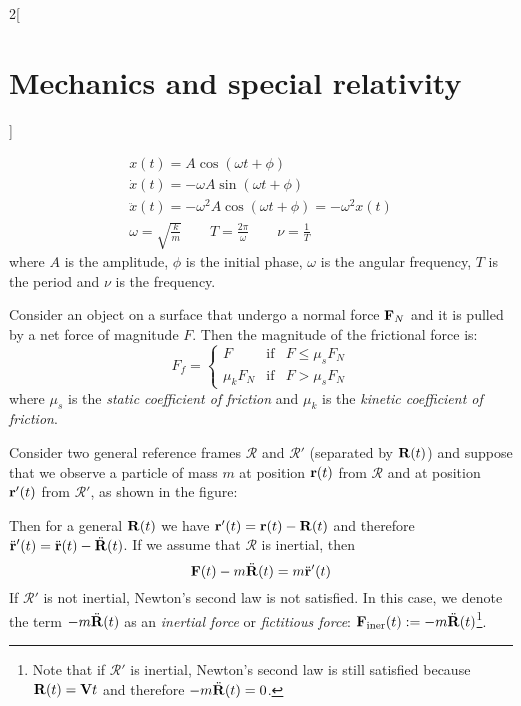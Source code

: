 \documentclass[../../../main.tex]{subfiles}
\begin{document}
\begin{multicols}{2}[\section{Mechanics and special relativity}]
\begin{prop}
    \begin{gather*}
      x(t)=A\cos(\omega t+\phi)\\
      \dot{x}(t)=-\omega A\sin(\omega t+\phi)\\
      \ddot{x}(t)=-\omega^2 A\cos(\omega t+\phi)=-\omega^2x(t)\\
      \omega=\sqrt{\frac{k}{m}}\qquad T=\frac{2\pi}{\omega}\qquad\nu=\frac{1}{T}
    \end{gather*}
    where $A$ is the amplitude, $\phi$ is the initial phase, $\omega$ is the angular frequency, $T$ is the period and $\nu$ is the frequency.
  \end{prop}
  \begin{prop}
    Consider an object on a surface that undergo a normal force $\boldsymbol{\mathrm{F}}_N$ and it is pulled by a net force of magnitude $F$. Then the magnitude of the frictional force is:
    $$
      F_f=\left\{
      \begin{array}{rcl}
        F        & \text{if} & F\leq\mu_sF_N \\
        \mu_kF_N & \text{if} & F>\mu_sF_N
      \end{array}\right.
    $$
    where $\mu_s$ is the \textit{static coefficient of friction} and $\mu_k$ is the \textit{kinetic coefficient of friction}.
  \end{prop}
  \begin{prop}
    Consider two general reference frames $\mathcal{R}$ and $\mathcal{R}'$ (separated by $\boldsymbol{\mathrm{R}}(t)$) and suppose that we observe a particle of mass $m$ at position $\boldsymbol{\mathrm{r}}(t)$ from $\mathcal{R}$ and at position $\boldsymbol{\mathrm{r}}'(t)$ from $\mathcal{R}'$, as shown in the figure:
    \begin{center}
      \begin{minipage}{\linewidth}
        \centering
        
      \end{minipage}
    \end{center}
    Then for a general $\boldsymbol{\mathrm{R}}(t)$ we have $\boldsymbol{\mathrm{r}}'(t)=\boldsymbol{\mathrm{r}}(t)-\boldsymbol{\mathrm{R}}(t)$ and therefore $\ddot{\boldsymbol{\mathrm{r}}}'(t)=\ddot{\boldsymbol{\mathrm{r}}}(t)-\ddot{\boldsymbol{\mathrm{R}}}(t)$. If we assume that $\mathcal{R}$ is inertial, then $$\boldsymbol{\mathrm{F}}(t)-m\ddot{\boldsymbol{\mathrm{R}}}(t)=m\ddot{\boldsymbol{\mathrm{r}}}'(t)$$ If $\mathcal{R}'$ is not inertial, Newton's second law is not satisfied. In this case, we denote the term $-m\ddot{\boldsymbol{\mathrm{R}}}(t)$ as an \textit{inertial force} or \textit{fictitious force}: $\boldsymbol{\mathrm{F}}_\text{iner}(t):=-m\ddot{\boldsymbol{\mathrm{R}}}(t)$\footnote{Note that if $\mathcal{R}'$ is inertial, Newton's second law is still satisfied because $\boldsymbol{\mathrm{R}}(t)=\boldsymbol{\mathrm{V}}t$ and therefore $-m\ddot{\boldsymbol{\mathrm{R}}}(t)=0$.}.

\end{prop}
\end{multicols}
\end{document}
